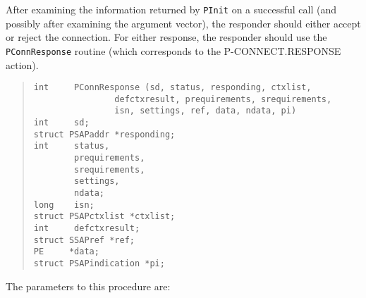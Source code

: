 After examining the information returned by \verb"PInit" on a successful call
(and possibly after examining the argument vector),
the responder should either accept or reject the connection.
For either response,
the responder should use
the \verb"PConnResponse" routine
(which corresponds to the {\sf P-CONNECT.RESPONSE\/} action).
\begin{quote}\small\begin{verbatim}
int     PConnResponse (sd, status, responding, ctxlist,
                defctxresult, prequirements, srequirements,
                isn, settings, ref, data, ndata, pi)
int     sd;
struct PSAPaddr *responding;
int     status,
        prequirements,
        srequirements,
        settings,
        ndata;
long	isn;
struct PSAPctxlist *ctxlist;
int     defctxresult;
struct SSAPref *ref;
PE     *data;
struct PSAPindication *pi;
\end{verbatim}\end{quote}
The parameters to this procedure are:\label{PConnResponse}
